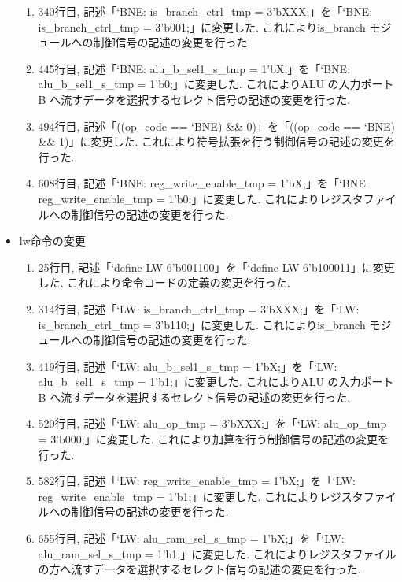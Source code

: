 \documentclass[epsf,a4paper,dvipdfmx,autodetect-engine,titlepage]{jsarticle}
\begin{document}
\begin{itemize}
\begin{enumerate}
    \item 340行目, 記述「`BNE:    is\_branch\_ctrl\_tmp = 3'bXXX;」を「`BNE:    is\_branch\_ctrl\_tmp = 3'b001;」に変更した. これによりis\_branch モジュールへの制御信号の記述の変更を行った.
    
    \item 445行目, 記述「`BNE:    alu\_b\_sel1\_s\_tmp = 1'bX;」を「`BNE:    alu\_b\_sel1\_s\_tmp = 1'b0;」に変更した. これによりALU の入力ポート B へ流すデータを選択するセレクト信号の記述の変更を行った.
    
    \item 494行目, 記述「((op\_code == `BNE) && 0)」を「((op\_code == `BNE) \&\& 1)」に変更した. これにより符号拡張を行う制御信号の記述の変更を行った.
    
    \item 608行目, 記述「`BNE:    reg\_write\_enable\_tmp = 1'bX;」を「`BNE:    reg\_write\_enable\_tmp = 1'b0;」に変更した. これによりレジスタファイルへの制御信号の記述の変更を行った.
\end{enumerate}
    \item lw命令の変更
\begin{enumerate}
    \item 25行目, 記述「`define     LW  6'b001100」を「`define     LW  6'b100011」に変更した. これにより命令コードの定義の変更を行った.
    
    \item 314行目, 記述「`LW:     is\_branch\_ctrl\_tmp = 3'bXXX;」を「`LW:     is\_branch\_ctrl\_tmp = 3'b110;」に変更した. これによりis\_branch モジュールへの制御信号の記述の変更を行った.
    
    \item 419行目, 記述「`LW:     alu\_b\_sel1\_s\_tmp = 1'bX;」を「`LW:     alu\_b\_sel1\_s\_tmp = 1'b1;」に変更した. これによりALU の入力ポート B へ流すデータを選択するセレクト信号の記述の変更を行った.
    
    \item 520行目, 記述「`LW:     alu\_op\_tmp = 3'bXXX;」を「`LW:     alu\_op\_tmp = 3'b000;」に変更した. これにより加算を行う制御信号の記述の変更を行った.
    
    \item 582行目, 記述「`LW:     reg\_write\_enable\_tmp = 1'bX;」を「`LW:     reg\_write\_enable\_tmp = 1'b1;」に変更した. これによりレジスタファイルへの制御信号の記述の変更を行った.
    
    \item 655行目, 記述「`LW:     alu\_ram\_sel\_s\_tmp = 1'bX;」を「`LW:     alu\_ram\_sel\_s\_tmp = 1'b1;」に変更した. これによりレジスタファイルの方へ流すデータを選択するセレクト信号の記述の変更を行った.
    

\end{enumerate}
\end{itemize}
\end{document}
